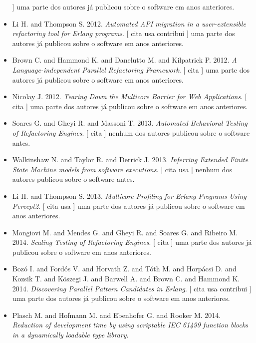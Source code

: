 \begin{itemize}
      ]
uma parte dos autores já publicou sobre o software em anos anteriores.
\item Li H. and Thompson S.
      2012.
        \textit{ Automated API migration in a user-extensible refactoring tool for Erlang programs}.
      [
          cita
          usa
          contribui
      ]
uma parte dos autores já publicou sobre o software em anos anteriores.
\item Brown C. and Hammond K. and Danelutto M. and Kilpatrick P.
      2012.
        \textit{ A Language-independent Parallel Refactoring Framework}.
      [
          cita
      ]
uma parte dos autores já publicou sobre o software em anos anteriores.
\item Nicolay J.
      2012.
        \textit{ Tearing Down the Multicore Barrier for Web Applications}.
      [
          cita
      ]
uma parte dos autores já publicou sobre o software em anos anteriores.
\item Soares G. and Gheyi R. and Massoni T.
      2013.
        \textit{ Automated Behavioral Testing of Refactoring Engines}.
      [
          cita
      ]
nenhum dos autores publicou sobre o software antes.
\item Walkinshaw N. and Taylor R. and Derrick J.
      2013.
        \textit{ Inferring Extended Finite State Machine models from software executions}.
      [
          cita
          usa
      ]
nenhum dos autores publicou sobre o software antes.
\item Li H. and Thompson S.
      2013.
        \textit{ Multicore Profiling for Erlang Programs Using Percept2}.
      [
          cita
          usa
      ]
uma parte dos autores já publicou sobre o software em anos anteriores.
\item Mongiovi M. and Mendes G. and Gheyi R. and Soares G. and Ribeiro M.
      2014.
        \textit{ Scaling Testing of Refactoring Engines}.
      [
          cita
      ]
uma parte dos autores já publicou sobre o software em anos anteriores.
\item Boz\'{o} I. and Ford\'{o}s V. and Horvath Z. and T\'{o}th M. and Horp\'{a}csi D. and Kozsik T. and K\"{o}szegi J. and Barwell A. and Brown C. and Hammond K.
      2014.
        \textit{ Discovering Parallel Pattern Candidates in Erlang}.
      [
          cita
          usa
          contribui
      ]
uma parte dos autores já publicou sobre o software em anos anteriores.
\item Plasch M. and Hofmann M. and Ebenhofer G. and Rooker M.
      2014.
        \textit{ Reduction of development time by using scriptable IEC 61499 function blocks in a dynamically loadable type library}.

\end{itemize}
